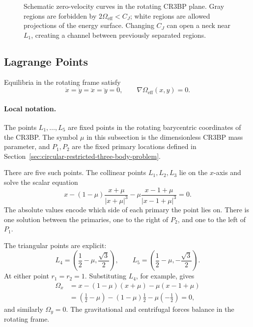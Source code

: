 \begin{figure}[htbp]
\caption{Schematic zero-velocity curves in the rotating CR3BP plane. Gray
regions are forbidden by \(2\Omega_{\mathrm{eff}}<C_J\); white regions are
allowed projections of the energy surface. Changing \(C_J\) can open a neck
near \(L_1\), creating a channel between previously separated regions.}
\label{fig:cr3bp-zero-velocity-neck}
\end{figure}

\subsection{Lagrange Points}
\label{subsec:lagrange-points}

Equilibria in the rotating frame satisfy
\[
  \dot x=\dot y=\ddot x=\ddot y=0,
  \qquad
  \nabla\Omega_{\mathrm{eff}}(x,y)=0.
\]

\paragraph{Local notation.}
The points \(L_1,\ldots,L_5\) are fixed points in the rotating barycentric
coordinates of the CR3BP.  The symbol \(\mu\) in this subsection is the
dimensionless CR3BP mass parameter, and \(P_1,P_2\) are the fixed primary
locations defined in Section~\ref{sec:circular-restricted-three-body-problem}.

There are five such points. The collinear points \(L_1,L_2,L_3\) lie on the
\(x\)-axis and solve the scalar equation
\[
  x
  -
  (1-\mu)\frac{x+\mu}{|x+\mu|^3}
  -
  \mu\frac{x-1+\mu}{|x-1+\mu|^3}
  =
  0.
\]
The absolute values encode which side of each primary the point lies on. There
is one solution between the primaries, one to the right of \(P_2\), and one to
the left of \(P_1\).

The triangular points are explicit:
\[
  \boxed{
  L_4=\left(\frac12-\mu,\frac{\sqrt3}{2}\right),
  \qquad
  L_5=\left(\frac12-\mu,-\frac{\sqrt3}{2}\right).
  }
\]
At either point \(r_1=r_2=1\). Substituting \(L_4\), for example, gives
\[
\begin{aligned}
  \Omega_x
  &=
  x-(1-\mu)(x+\mu)-\mu(x-1+\mu)\\
  &=
  \left(\frac12-\mu\right)
  -(1-\mu)\frac12
  -\mu\left(-\frac12\right)
  =
  0,
\end{aligned}
\]
and similarly \(\Omega_y=0\). The gravitational and centrifugal forces balance
in the rotating frame.


